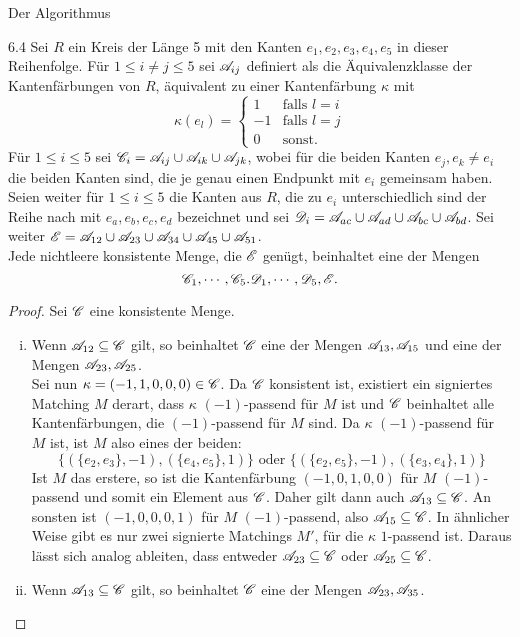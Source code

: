 \begin{section}{Der Algorithmus}
 \begin{lemmal}{ }{6.4}
  Sei $R$ ein Kreis der Länge 5 mit den Kanten $e_1,e_2,e_3,e_4,e_5$ in dieser Reihenfolge. Für $1 \leq i \neq j \leq 5$ sei $\mathscr{A}_{ij}$ definiert als die Äquivalenzklasse der Kantenfärbungen von $R$, äquivalent zu einer Kantenfärbung $\kappa$ mit 
  \[\kappa(e_l) = \begin{cases}
    1 &\text{falls } l = i\\
    -1 &\text{falls } l = j\\
    0 &\text{sonst.}
   \end{cases}\]
  Für $1 \leq i \leq 5$ sei $\mathscr{C}_i = \mathscr{A}_{ij}\cup\mathscr{A}_{ik}\cup\mathscr{A}_{jk}$, wobei für die beiden Kanten $e_j,e_k \neq e_i$ die beiden Kanten sind, die je genau einen Endpunkt mit $e_i$ gemeinsam haben. Seien weiter für $1\leq i \leq 5$ die Kanten aus $R$, die zu $e_i$ unterschiedlich sind der Reihe nach mit $e_a,e_b,e_c,e_d$ bezeichnet und sei  $\mathscr{D}_i = \mathscr{A}_{ac}\cup\mathscr{A}_{ad}\cup\mathscr{A}_{bc}\cup\mathscr{A}_{bd}$. Sei weiter $\mathscr{E} = \mathscr{A}_{12}\cup\mathscr{A}_{23}\cup\mathscr{A}_{34}\cup\mathscr{A}_{45}\cup\mathscr{A}_{51}$.\\
  Jede nichtleere konsistente Menge, die $\mathscr{E}$ genügt, beinhaltet eine der Mengen 
  \[\mathscr{C}_1,\cdots,\mathscr{C}_5.\mathscr{D}_1,\cdots,\mathscr{D}_5,\mathscr{E}\text{.}\]
 \end{lemmal}
 \begin{proof}
  Sei $\mathscr{C}$ eine konsistente Menge.
  \begin{enumerate}[(i)]
   \item Wenn $\mathscr{A}_{12} \subseteq \mathscr{C}$ gilt, so beinhaltet $\mathscr{C}$ eine der Mengen $\mathscr{A}_{13},\mathscr{A}_{15}$ und eine der Mengen $\mathscr{A}_{23},\mathscr{A}_{25}$.\\
   Sei nun $\kappa = (-1,1,0,0,0) \in \mathscr{C}$. Da $\mathscr{C}$ konsistent ist, existiert ein signiertes Matching $M$ derart, dass $\kappa$ $(-1)$-passend für $M$ ist und $\mathscr{C}$ beinhaltet alle Kantenfärbungen, die $(-1)$-passend für $M$ sind. Da $\kappa$ $(-1)$-passend für $M$ ist, ist $M$ also eines der beiden:
   \[ \{(\{e_2,e_3\},-1),(\{e_4,e_5\},1)\} \text{ oder } \{(\{e_2,e_5\},-1),(\{e_3,e_4\},1)\} \]
   Ist $M$ das erstere, so ist die Kantenfärbung $(-1,0,1,0,0)$ für $M$ $(-1)$-passend und somit ein Element aus $\mathscr{C}$. Daher gilt dann auch $\mathscr{A}_{13}\subseteq\mathscr{C}$. An sonsten ist $(-1,0,0,0,1)$ für $M$ $(-1)$-passend, also $\mathscr{A}_{15}\subseteq\mathscr{C}$. In ähnlicher Weise gibt es nur zwei signierte Matchings $M'$, für die $\kappa$ $1$-passend ist. Daraus lässt sich analog ableiten, dass entweder $\mathscr{A}_{23}\subseteq\mathscr{C}$ oder $\mathscr{A}_{25}\subseteq\mathscr{C}$.
   \item Wenn $\mathscr{A}_{13} \subseteq \mathscr{C}$ gilt, so beinhaltet $\mathscr{C}$ eine der Mengen $\mathscr{A}_{23},\mathscr{A}_{35}$.\\

\end{enumerate}
\end{proof}
\end{section}
